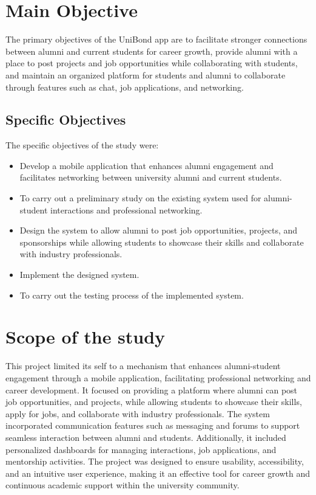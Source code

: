 \documentclass[12pt, a4paper]{report}
\begin{document}
\section{Main Objective}
The primary objectives of the UniBond app are to facilitate stronger connections between alumni and current students for career growth, provide alumni with a place to post projects and job opportunities while collaborating with students, and maintain an organized platform for students and alumni to collaborate through features such as chat, job applications, and networking.
\subsection{Specific Objectives}
The specific objectives of the study were:
\begin{itemize}
\item Develop a mobile application that enhances alumni engagement and facilitates networking between university alumni and current students. 
\item To carry out a preliminary study on the existing system used for alumni-student interactions and professional networking.
\item Design the system to allow alumni to post job opportunities, projects, and sponsorships while allowing students to showcase their skills and collaborate with industry professionals.
\item Implement the designed system.
\item To carry out the testing process of the implemented system.
\end{itemize}

\section{Scope of the study}
This project limited its self to a mechanism that enhances alumni-student engagement through a mobile application, facilitating professional networking and career development. It focused on providing a platform where alumni can post job opportunities, and projects, while allowing students to showcase their skills, apply for jobs, and collaborate with industry professionals.
The system incorporated communication features such as messaging and forums to support seamless interaction between alumni and students. Additionally, it included personalized dashboards for managing interactions, job applications, and mentorship activities. The project was designed to ensure usability, accessibility, and an intuitive user experience, making it an effective tool for career growth and continuous academic support within the university community.
\end{document}
